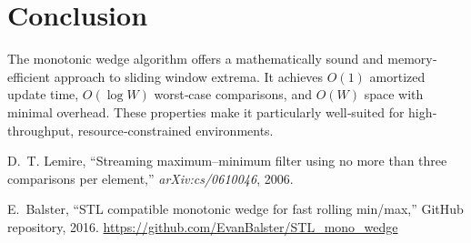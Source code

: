 \documentclass[12pt]{article}
\begin{document}
\section{Conclusion}
The monotonic wedge algorithm offers a mathematically sound and memory‐efficient approach to sliding window extrema.  It achieves \(O(1)\) amortized update time, \(O(\log W)\) worst‐case comparisons, and \(O(W)\) space with minimal overhead.  These properties make it particularly well‐suited for high‐throughput, resource‐constrained environments.

\begin{thebibliography}{9}
D.~T. Lemire, “Streaming maximum–minimum filter using no more than three comparisons per element,” \emph{arXiv:cs/0610046}, 2006.

E.~Balster, “STL compatible monotonic wedge for fast rolling min/max,” GitHub repository, 2016. \url{https://github.com/EvanBalster/STL_mono_wedge}
\end{thebibliography}
\end{document}
